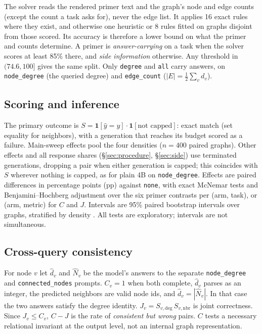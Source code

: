 \documentclass[11pt]{article}
\newcommand{\task}[1]{\texttt{#1}}
\newcommand{\cond}[1]{\texttt{#1}}
\begin{document}
The solver reads the rendered primer text and the graph's node and edge
counts (except the count a task asks for), never the edge list. It applies
16 exact rules where they exist, and otherwise one heuristic or 8 rules
fitted on graphs disjoint from those scored. Its accuracy is therefore a
lower bound on what the primer and counts determine. A primer is
\emph{answer-carrying} on a task when the solver scores at least 85\% there,
and \emph{side information} otherwise. Any threshold in $(74.6,100]$ gives
the same split. Only \cond{degree} and \cond{all} carry answers, on
\task{node\_degree} (the queried degree) and \task{edge\_count}
($|E|{=}\tfrac12\sum_v d_v$).

\subsection{Scoring and inference}

The primary outcome is $S{=}\mathbf{1}[\hat y{=}y]\cdot\mathbf{1}[\text{not
capped}]$: exact match (set equality for neighbors), with a generation that
reaches its budget scored as a failure. Main-sweep effects pool the four
densities ($n{=}400$ paired graphs). Other effects and all response shares
(\S\ref{sec:procedure}, \S\ref{sec:side}) use terminated generations,
dropping a pair when either generation is capped; this coincides with $S$
wherever nothing is capped, as for plain 4B on \task{node\_degree}. Effects
are paired differences in percentage points (pp) against \cond{none}, with
exact McNemar tests \citep{mcnemar1947note} and Benjamini--Hochberg
adjustment \citep{benjaminihochberg1995controlling} over the six primer
contrasts per (arm, task), or (arm, metric) for $C$ and $J$. Intervals are
95\% paired bootstrap intervals over graphs, stratified by density
\citep{efron1979bootstrap}. All tests are exploratory; intervals are not
simultaneous.

\subsection{Cross-query consistency}
\label{sec:cj}

For node $v$ let $\hat d_v$ and $\hat N_v$ be the model's answers to the
separate \task{node\_degree} and \task{connected\_nodes} prompts. $C_v{=}1$
when both complete, $\hat d_v$ parses as an integer, the predicted neighbors
are valid node ids, and $\hat d_v{=}|\hat N_v|$. In that case the two answers
satisfy the degree identity. $J_v{=}S_{v,\text{deg}}\,S_{v,\text{nbr}}$ is
joint correctness. Since $J_v\le C_v$, $C{-}J$ is the rate of
\emph{consistent but wrong} pairs. $C$ tests a necessary relational
invariant at the output level, not an internal graph representation.
\end{document}

